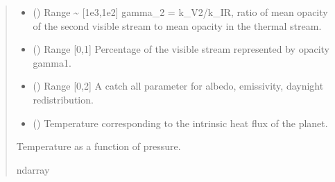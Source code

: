\documentclass[letterpaper,10pt,english]{sphinxmanual}
\begin{document}
\begin{fulllineitems}
\begin{quote}
\begin{description}
\begin{itemize}
\item {} 
\sphinxAtStartPar
{} () \textendash{} Range \textasciitilde{} {[}1e\sphinxhyphen{}3,1e2{]}
gamma\_2 = k\_V2/k\_IR, ratio of mean opacity of the second visible stream
to mean opacity in the thermal stream.

\item {} 
\sphinxAtStartPar
{} () \textendash{} Range {[}0,1{]}
Percentage of the visible stream represented by opacity gamma1.

\item {} 
\sphinxAtStartPar
{} () \textendash{} Range {[}0,2{]}
A catch all parameter for albedo, emissivity, day\sphinxhyphen{}night redistribution.

\item {} 
\sphinxAtStartPar
{} () \textendash{} Temperature corresponding to the intrinsic heat flux of the planet.

\end{itemize}

\sphinxAtStartPar
{} \textendash{} Temperature as a function of pressure.

\sphinxAtStartPar
ndarray

\end{description}\end{quote}

\end{fulllineitems}

\end{document}
